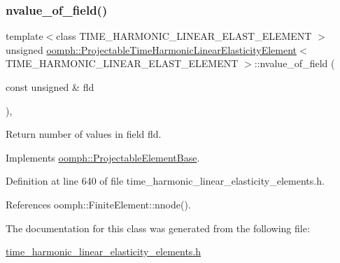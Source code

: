 \subsubsection{\texorpdfstring{nvalue\+\_\+of\+\_\+field()}{nvalue\_of\_field()}}
{\footnotesize\ttfamily template$<$class T\+I\+M\+E\+\_\+\+H\+A\+R\+M\+O\+N\+I\+C\+\_\+\+L\+I\+N\+E\+A\+R\+\_\+\+E\+L\+A\+S\+T\+\_\+\+E\+L\+E\+M\+E\+NT $>$ \\
unsigned \hyperlink{classoomph_1_1ProjectableTimeHarmonicLinearElasticityElement}{oomph\+::\+Projectable\+Time\+Harmonic\+Linear\+Elasticity\+Element}$<$ T\+I\+M\+E\+\_\+\+H\+A\+R\+M\+O\+N\+I\+C\+\_\+\+L\+I\+N\+E\+A\+R\+\_\+\+E\+L\+A\+S\+T\+\_\+\+E\+L\+E\+M\+E\+NT $>$\+::nvalue\+\_\+of\+\_\+field (\begin{DoxyParamCaption}\item[{const unsigned \&}]{fld }\end{DoxyParamCaption})\hspace{0.3cm}{\ttfamily [inline]}, {\ttfamily [virtual]}}



Return number of values in field fld. 



Implements \hyperlink{classoomph_1_1ProjectableElementBase_a1a9a6de16f3511bca8e8be770abb9c2e}{oomph\+::\+Projectable\+Element\+Base}.



Definition at line 640 of file time\+\_\+harmonic\+\_\+linear\+\_\+elasticity\+\_\+elements.\+h.



References oomph\+::\+Finite\+Element\+::nnode().



The documentation for this class was generated from the following file\+:\begin{DoxyCompactItemize}
\item 
\hyperlink{time__harmonic__linear__elasticity__elements_8h}{time\+\_\+harmonic\+\_\+linear\+\_\+elasticity\+\_\+elements.\+h}\end{DoxyCompactItemize}
